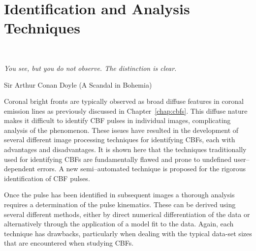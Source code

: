 
\chapter{Identification and Analysis Techniques}
\label{chap:methods}

\ifpdf
    \graphicspath{{5/figures/PNG/}{5/figures/PDF/}{5/figures/}}
\else
    \graphicspath{{5/figures/EPS/}{5/figures/}}
\fi





\noindent 
\\ {\it 
You see, but you do not observe. The distinction is clear.
\begin{flushright}
Sir Arthur Conan Doyle (A Scandal in Bohemia) \\
\end{flushright}
 }


\vspace{15mm}
Coronal bright fronts are typically observed as broad diffuse features in coronal emission lines as previously discussed in Chapter~\ref{chap:cbfs}. This diffuse nature makes it difficult to identify CBF pulses in individual images, complicating analysis of the phenomenon. These issues have resulted in the development of several different image processing techniques for identifying CBFs, each with advantages and disadvantages. It is shown here that the techniques traditionally used for identifying CBFs are fundamentally flawed and prone to undefined user--dependent errors. A new semi--automated technique is proposed for the rigorous identification of CBF pulses.

Once the pulse has been identified in subsequent images a thorough analysis requires a determination of the pulse kinematics. These can be derived using several different methods, either by direct numerical differentiation of the data or alternatively through the application of a model fit to the data. Again, each technique has drawbacks, particularly when dealing with the typical data-set sizes that are encountered when studying CBFs. 

